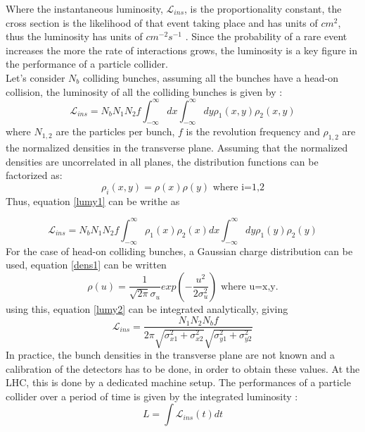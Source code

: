 Where the instantaneous luminosity, $\mathcal{L}_{ins}$, is the proportionality constant, the cross section is the likelihood of that event taking place and has units of $cm^{2}$, thus the luminosity has units of $cm^{-2}s^{-1}$ \cite{White}. Since the probability of a rare event increases the more the rate of interactions grows, the luminosity is a key figure in the performance of a particle collider.\\
Let's consider $N_b$ colliding bunches, assuming all the bunches have a head-on collision, the luminosity of all the colliding bunches is given by \cite{CERN-THESIS-2018-051}: 
\begin{equation}
    \mathcal{L}_{ins}=  N_b N_1 N_2f\int^{\infty}_{-\infty}dx\int^{\infty}_{-\infty}dy \rho_1(x,y)\rho_2(x,y)
    \label{lumy1}
\end{equation}
where $N_{1,2}$ are the particles per bunch, $f$ is the revolution frequency and $\rho_{1,2}$ are the normalized densities in the transverse plane. Assuming that the normalized densities are uncorrelated in all planes, the distribution functions can be factorized as:
\begin{equation}
    \rho_i(x,y)=\rho(x)\rho(y) \text { where i=1,2}
    \label{dens1}
\end{equation}
Thus, equation \ref{lumy1} can be writhe as 

\begin{equation}
    \mathcal{L}_{ins}=  N_b N_1 N_2f\int^{\infty}_{-\infty}\rho_1(x)\rho_2(x)dx\int^{\infty}_{-\infty}dy \rho_1(y)\rho_2(y)
    \label{lumy2}
\end{equation}
For the case of head-on colliding bunches, a Gaussian charge distribution can be used, equation \ref{dens1} can be written
\begin{equation}
    \rho(u)=\frac{1}{\sqrt{2\pi}\sigma_u} exp\left(-\frac{u^2}{2\sigma_u^2}\right) \text { where u=x,y.}
    \label{dens2}
\end{equation}
using this, equation \ref{lumy2} can be integrated analytically, giving 
\begin{equation}
    \mathcal{L}_{ins}=\frac{N_1N_2N_b f}{2\pi
    \sqrt{\sigma^2_{x1}+\sigma^2_{x2}}\sqrt{\sigma^2_{y1}+\sigma^2_{y2}}}
    \label{lumy3}
\end{equation}
In practice, the bunch densities in the transverse plane are not known and a calibration of the detectors has to be done, in order to obtain these values. At the LHC, this is done by a dedicated machine setup.  
The performances of a particle collider over a period of time is given by the integrated luminosity :
\begin{equation}
L=\int \mathcal{L}_{ins}(t)dt
\label{lum0}
\end{equation}

